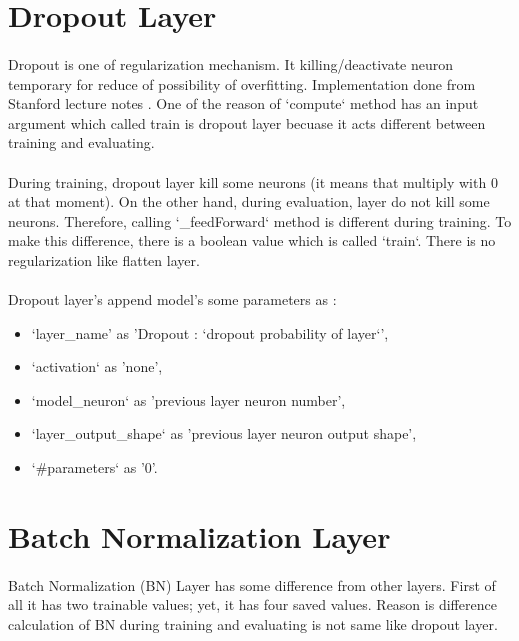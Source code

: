 \documentclass[12pt]{report}
\begin{document}
\section{Dropout Layer}

\paragraph{}
Dropout is one of regularization mechanism. It killing/deactivate neuron temporary for reduce of possibility of overfitting. Implementation done from Stanford lecture notes \cite{cs231}. One of the reason of `compute` method has an input argument which called train is dropout layer becuase it acts different between training and evaluating. 

\paragraph{}
During training, dropout layer kill some neurons (it means that multiply with 0 at that moment). On the other hand, during evaluation, layer do not kill some neurons. Therefore, calling `\_feedForward` method is different during training. To make this difference, there is a boolean value which is called `train`. There is no regularization like flatten layer.

\paragraph{}
Dropout layer's append model's some parameters as :

\begin{itemize}
	\item `layer\_name' as 'Dropout : `dropout probability of layer`',
	\item `activation` as 'none',
	\item `model\_neuron` as 'previous layer neuron number',
	\item `layer\_output\_shape` as 'previous layer neuron output shape',
	\item `\#parameters` as '0'.
\end{itemize}



\section{Batch Normalization Layer}

\paragraph{}
Batch Normalization (BN) Layer has some difference from other layers. First of all it has two trainable values; yet, it has four saved values. Reason is difference calculation of BN during training and evaluating is not same like dropout layer. 
\end{document}
